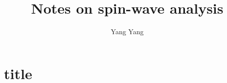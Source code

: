 \documentclass[a4paper,12pt]{article}
\title{Notes on spin-wave analysis}
\author{Yang Yang}
\begin{document}
	\maketitle
	\section{title}
\end{document}
